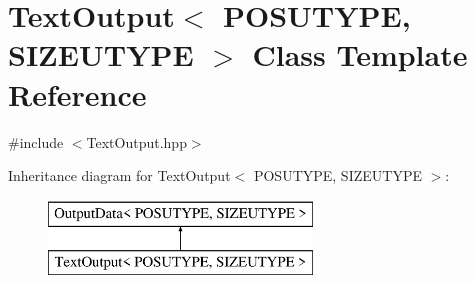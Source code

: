 \hypertarget{class_text_output}{\section{Text\-Output$<$ P\-O\-S\-U\-T\-Y\-P\-E, S\-I\-Z\-E\-U\-T\-Y\-P\-E $>$ Class Template Reference}
\label{class_text_output}
}


{\ttfamily \#include $<$Text\-Output.\-hpp$>$}

Inheritance diagram for Text\-Output$<$ P\-O\-S\-U\-T\-Y\-P\-E, S\-I\-Z\-E\-U\-T\-Y\-P\-E $>$\-:\begin{figure}[H]
\begin{center}
\leavevmode
\includegraphics[height=2.000000cm]{class_text_output}
\end{center}
\end{figure}
